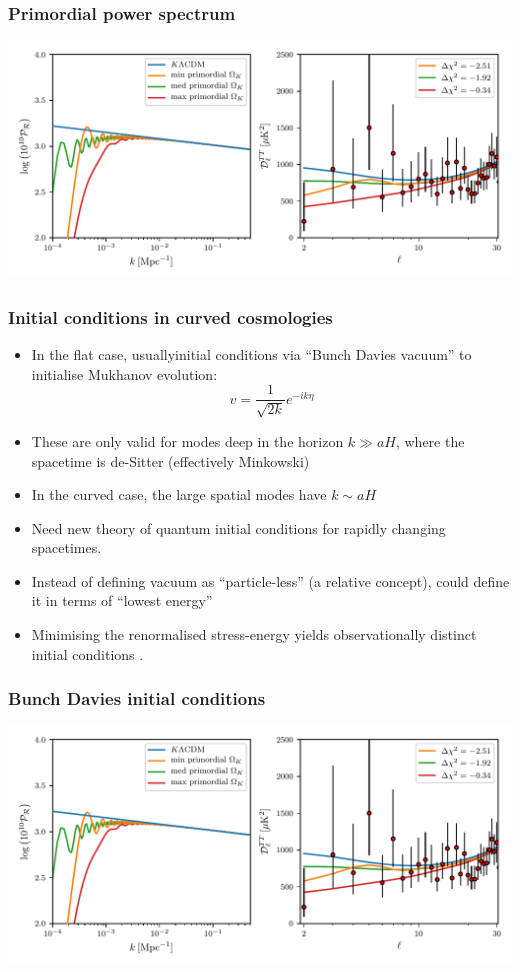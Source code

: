 \documentclass[%
]{beamer}
\begin{document}
\begin{frame}
    \frametitle{Primordial power spectrum}
    \includegraphics[width=\textwidth]{figures/BD.pdf}
\end{frame}

\begin{frame}
    \frametitle{Initial conditions in curved cosmologies}
    \begin{itemize}
        \item In the flat case, usuallyinitial conditions via ``Bunch Davies vacuum''  to initialise Mukhanov evolution:
            \[ v = \frac{1}{\sqrt{2k}} e^{-i k\eta}\]
        \item These are only valid for modes deep in the horizon $k\gg aH$, where the spacetime is de-Sitter (effectively Minkowski)
        \item In the curved case, the large spatial modes have $k\sim aH$
        \item Need new theory of quantum initial conditions for rapidly changing spacetimes.
        \item Instead of defining vacuum as ``particle-less'' (a relative concept), could define it in terms of ``lowest energy''
        \item Minimising the renormalised stress-energy yields observationally distinct initial conditions .
    \end{itemize}
\end{frame}


\begin{frame}
    \frametitle{Bunch Davies initial conditions}
    \includegraphics[width=\textwidth]{figures/BD.pdf}
\end{frame}
\end{document}
